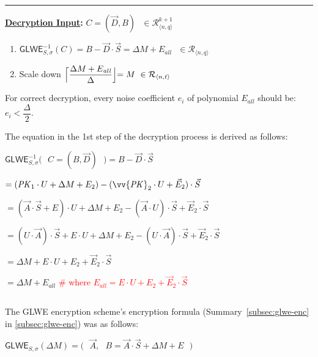 \begin{tcolorbox}[title={\textbf{\tboxlabel{\ref*{subsec:glwe-enc}} GLWE Public Key Encryption}}]
\begin{enumerate}
\end{enumerate}


\par\noindent\rule{\textwidth}{0.4pt}

\textbf{\underline{Decryption Input}:} $C = (\vec{D}, B) \text{ } \in \mathcal{R}_{\langle n,q \rangle}^{k + 1}$

\begin{enumerate}
\item $\textsf{GLWE}^{-1}_{S,\sigma}(C) = B - \vec{D} \cdot \vec{S} = \Delta  M + E_{\mathit{all}} \text{ } \in \mathcal{R}_{\langle n,q \rangle}$

\item Scale down 
$\Bigl\lceil \dfrac{ \Delta  M + E_{\mathit{all}} }{\Delta}\Bigl\rfloor = M  \text{ } \in \mathcal{R}_{\langle n, t \rangle}$

\end{enumerate}

For correct decryption, every noise coefficient $e_i$ of polynomial $E_{\mathit{all}}$ should be: $e_i < \dfrac{\Delta}{2}$.

\end{tcolorbox}


The equation in the 1st step of the decryption process is derived as follows:

$\textsf{GLWE}^{-1}_{S,\sigma}\bm{(}\text{ } C = (B, \vec{D}) \text{ }\bm{)} = B - \vec{D}\cdot\vec{S}$

$ = (\mathit{PK}_1\cdot U + \Delta  M + E_2) - (\vv{\mathit{PK}}_2 \cdot U + \vec{E}_2)\cdot \vec{S} $

$=  (\vec{A} \cdot \vec{S} + E)\cdot U + \Delta M + E_2 - (\vec{A}\cdot U)\cdot \vec{S} + \vec{E}_2\cdot\vec{S}$

$=  (U\cdot\vec{A}) \cdot \vec{S} + E \cdot U + \Delta M + E_2 - (U\cdot \vec{A}) \cdot \vec{S} + \vec{E}_2\cdot\vec{S}$

$= \Delta M + E \cdot U + E_2 + \vec{E}_2\cdot\vec{S}$

$= \Delta M + E_{\mathit{all}}$ \textcolor{red}{\text{ } \# where $E_{\mathit{all}} = E \cdot U + E_2 + \vec{E}_2\cdot\vec{S}$} 


$ $

 The GLWE encryption scheme's encryption formula (Summary~\ref{subsec:glwe-enc} in \autoref{subsec:glwe-enc}) was as follows: 

$\textsf{GLWE}_{S, \sigma}(\Delta M) = \bm{(} \text{ } \vec{A}, \text{ } B = \vec{A}\cdot\vec{S} + \Delta M + E \text{ }\bm{)}$

